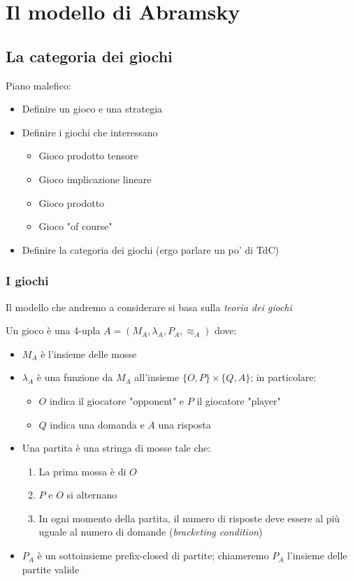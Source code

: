 \documentclass{beamer}
\begin{document}
\section{Il modello di Abramsky}

\subsection{La categoria dei giochi}

\begin{frame}
	Piano malefico:
	\begin{itemize}
	\item Definire un gioco e una strategia
	\item Definire i giochi che interessano
		\begin{itemize}
		\item Gioco prodotto tensore
		\item Gioco implicazione lineare
		\item Gioco prodotto
		\item Gioco "of course"
		\end{itemize}
	\item Definire la categoria dei giochi (ergo parlare un po' di TdC)
	\end{itemize}
\end{frame}

\begin{frame}
	\frametitle{I giochi}
	
	Il modello che andremo a considerare si basa sulla \emph{teoria dei giochi}
	
	
	Un gioco è una 4-upla $A=( M_A , \lambda_A , P_A , \approx_A )$ dove:
	\begin{itemize}
	\item $M_A$ è l'insieme delle mosse
	\item $\lambda_A$ è una funzione da $M_A$ all'insieme $\{ O,P\} \times \{Q,A\}$; in particolare:
		\begin{itemize}
		\item $O$ indica il giocatore "opponent" e $P$ il giocatore "player"
		\item $Q$ indica una domanda e $A$ una risposta
		\end{itemize}
	\item Una partita è una stringa di mosse tale che:
		\begin{enumerate}
		\item La prima mossa è di $O$
		\item $P$ e $O$ si alternano
		\item In ogni momento della partita, il numero di risposte deve essere al più uguale al numero di domande (\emph{bracketing condition})
		\end{enumerate}
	\item $P_A$ è un sottoinsieme prefix-closed di partite; chiameremo $P_A$ l'insieme delle partite valide
	\end{itemize}
	
	
\end{frame}
\end{document}
